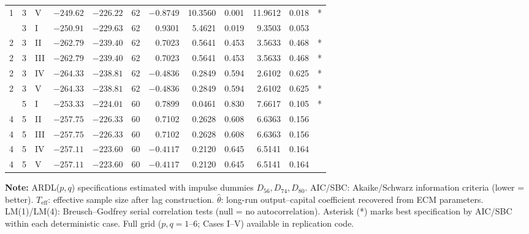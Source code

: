 \begin{landscape}
\begin{longtable}[t]{rrlrrrrrrrll}
1 & 3 & V & $-249.62$ & $-226.22$ & 62 & $-0.8749$ & 10.3560 & 0.001 & 11.9612 & 0.018 & * \\
\addlinespace
2 & 3 & I & $-250.91$ & $-229.63$ & 62 & 0.9301 & 5.4621 & 0.019 & 9.3503 & 0.053 & \\
2 & 3 & II & $-262.79$ & $-239.40$ & 62 & 0.7023 & 0.5641 & 0.453 & 3.5633 & 0.468 & * \\
2 & 3 & III & $-262.79$ & $-239.40$ & 62 & 0.7023 & 0.5641 & 0.453 & 3.5633 & 0.468 & * \\
2 & 3 & IV & $-264.33$ & $-238.81$ & 62 & $-0.4836$ & 0.2849 & 0.594 & 2.6102 & 0.625 & * \\
2 & 3 & V & $-264.33$ & $-238.81$ & 62 & $-0.4836$ & 0.2849 & 0.594 & 2.6102 & 0.625 & * \\
\addlinespace
4 & 5 & I & $-253.33$ & $-224.01$ & 60 & 0.7899 & 0.0461 & 0.830 & 7.6617 & 0.105 & * \\
4 & 5 & II & $-257.75$ & $-226.33$ & 60 & 0.7102 & 0.2628 & 0.608 & 6.6363 & 0.156 & \\
4 & 5 & III & $-257.75$ & $-226.33$ & 60 & 0.7102 & 0.2628 & 0.608 & 6.6363 & 0.156 & \\
4 & 5 & IV & $-257.11$ & $-223.60$ & 60 & $-0.4117$ & 0.2120 & 0.645 & 6.5141 & 0.164 & \\
4 & 5 & V & $-257.11$ & $-223.60$ & 60 & $-0.4117$ & 0.2120 & 0.645 & 6.5141 & 0.164 & \\
\bottomrule
\end{longtable}
\noindent\footnotesize\textbf{Note:} ARDL($p,q$) specifications estimated with impulse dummies $D_{56}, D_{74}, D_{80}$. AIC/SBC: Akaike/Schwarz information criteria (lower = better). $T_{\text{eff}}$: effective sample size after lag construction. $\hat{\theta}$: long-run output--capital coefficient recovered from ECM parameters. LM(1)/LM(4): Breusch--Godfrey serial correlation tests (null = no autocorrelation). Asterisk (*) marks best specification by AIC/SBC within each deterministic case. Full grid ($p,q = 1\text{--}6$; Cases I--V) available in replication code.
\end{landscape}